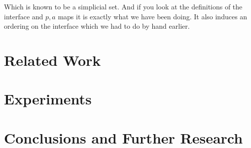 \documentclass[12pt]{article}
\newcommand{\1}{\mathbbm{1}}
\begin{document}
Which is known to be a simplicial set. And if you look at the definitions of the interface and $p, a$ maps it is exactly what we have been doing. It also induces an ordering on the interface which we had to do by hand earlier.

\newpage
\section{Related Work}\label{relatedwork}

\section{Experiments}\label{experiments}

\section{Conclusions and Further Research}\label{conclusions}





\end{document}
